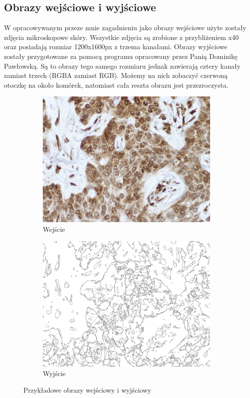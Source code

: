 \documentclass{article}
\begin{document}
\subsection{Obrazy wejściowe i wyjściowe}
W opracowywanym przeze mnie zagadnieniu jako obrazy wejściowe użyte zostały zdjęcia mikroskopowe skóry.
Wszystkie zdjęcia są zrobione z przybliżeniem x40 oraz posiadają rozmiar 1200x1600px z trzema kanałami.
Obrazy wyjściowe zostały przygotowane za pomocą programu opracowany przez Panią Dominikę Pawłowską.
Są to obrazy tego samego rozmiaru jednak zawierają cztery kanały zamiast trzech (RGBA zamiast RGB).
Możemy na nich zobaczyć czerwoną otoczkę na około komórek, natomiast cała reszta obrazu jest przezroczysta.
\begin{figure}[H]
  \centering
  \begin{subfigure}{0.4\linewidth}
    \includegraphics[width=\linewidth]{images/input.png}
    \caption{Wejście}
  \end{subfigure}
  \begin{subfigure}{0.4\linewidth}
    \includegraphics[width=\linewidth]{images/output.jpg}
    \caption{Wyjście}
  \end{subfigure}
  \caption{Przykładowe obrazy wejściowy i wyjściowy}
  \label{fig:input_and_output}
\end{figure}
\newpage
\end{document}
